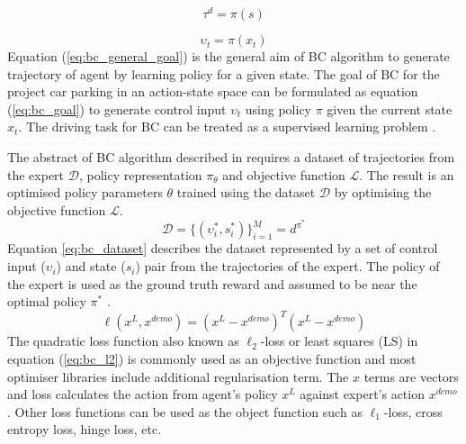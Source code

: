\documentclass{svproc}
\begin{document}
\begin{equation}
\tau^d = \pi(s)
\label{eq:bc_general_goal}
\end{equation}

\begin{equation}
\upsilon_t = \pi(x_t)
\label{eq:bc_goal}
\end{equation}
Equation (\ref{eq:bc_general_goal}) is the general aim of BC algorithm to generate trajectory of agent by learning policy for a given state. The goal of BC for the project car parking in an action-state space can be formulated as equation (\ref{eq:bc_goal}) to generate control input $\upsilon_t$ using policy $\pi$ given the current state $x_t$. The driving task for BC can be treated as a supervised learning problem \cite{ly2020learning}\cite{osa2018algorithmic}\cite{saksena2019towards}. 

The abstract of BC algorithm described in \cite{osa2018algorithmic} requires a dataset of trajectories from the expert $\mathcal{D}$, policy representation $\pi_\theta$ and objective function $\mathcal{L}$. The result is an optimised policy parameters $\theta$ trained using the dataset $\mathcal{D}$ by optimising the objective function $\mathcal{L}$.
%
\begin{equation}
\mathcal{D} = \{ (\upsilon_i^*, s_i^*) \}^M_{i=1} = d^{\pi^*}
\label{eq:bc_dataset}
\end{equation}
Equation \ref{eq:bc_dataset} describes the dataset represented by a set of control input ($\upsilon_i$) and state ($s_i$) pair from the trajectories of the expert. The policy of the expert is used as the ground truth reward and assumed to be near the optimal policy $\pi^*$ \cite{lecture6789wen}.
\begin{equation}
\ell(x^L,x^{demo}) = (x^L - x^{demo})^T(x^L-x^{demo})
\label{eq:bc_l2}
\end{equation}
The quadratic loss function also known as $\ell_2$-loss or least squares (LS) in equation (\ref{eq:bc_l2}) is commonly used as an objective function and most optimiser libraries include additional regularisation term. The $x$ terms are vectors and loss calculates the action from agent's policy $x^L$ against expert's action $x^{demo}$. Other loss functions can be used as the object function such as $\ell_1$-loss, cross entropy loss, hinge loss, etc.

\end{document}
